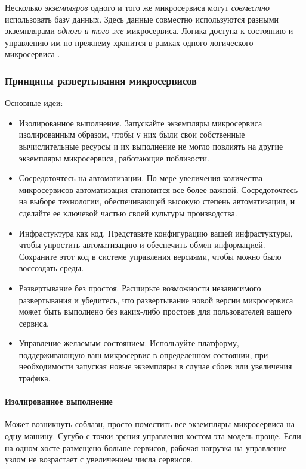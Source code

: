 \documentclass[%
	11pt,
	a4paper,
	utf8,
		]{article}
\begin{document}
Несколько \emph{экземпляров} одного и того же микросервиса могут \emph{совместно} использовать базу данных. Здесь данные совместно используются разными экземплярами \emph{одного и того же} микросервиса. Логика доступа к состоянию и управлению им по-прежнему хранится в рамках одного логического микросервиса \cite[]{microservices-2024}.

\subsubsection{Принципы развертывания микросервисов}

Основные идеи:
\begin{itemize}
	\item Изолированное выполнение. Запускайте экземпляры микросервиса изолированным образом, чтобы у них были свои собственные вычислительные ресурсы и их выполнение не могло повлиять на другие экземпляры микросервиса, работающие поблизости.
	
	\item Сосредоточтесь на автоматизации. По мере увеличения количества микросервисов автоматизация становится все более важной. Сосредоточтесь на выборе технологии, обеспечивающей высокую степень автоматизации, и сделайте ее ключевой частью своей культуры производства.
	
	\item Инфрастуктура как код. Представьте конфигурацию вашей инфрастуктуры, чтобы упростить автоматизацию и обеспечить обмен информацией. Сохраните этот код в системе управления версиями, чтобы можно было воссоздать среды.
	
	\item Развертывание без простоя. Расширьте возможности независимого развертывания и убедитесь, что развертывание новой версии микросервиса может быть выполнено без каких-либо простоев для пользователей вашего сервиса.
	
	\item Управление желаемым состоянием. Используйте платформу, поддерживающую ваш микросервис в определенном состоянии, при необходимости запуская новые экземпляры в случае сбоев или увеличения трафика.
\end{itemize}

\paragraph{Изолированное выполнение} Может возникнуть соблазн, просто поместить все экземпляры микросервиса на одну машину. Сугубо с точки зрения управления хостом эта модель проще. Если на одном хосте размещено больше сервисов, рабочая нагрузка на управление узлом не возрастает с увеличением числа сервисов.
\end{document}
